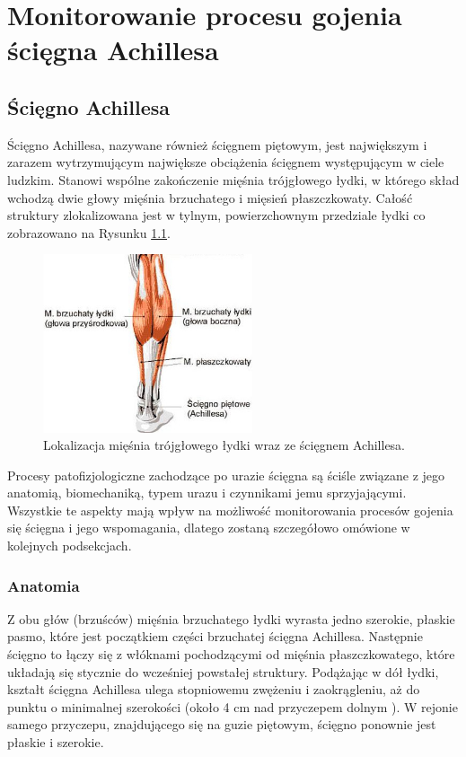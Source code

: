 \chapter{Monitorowanie procesu gojenia ścięgna Achillesa}
\section{Ścięgno Achillesa}
Ścięgno Achillesa, nazywane również ścięgnem piętowym, jest największym i zarazem wytrzymującym największe obciążenia ścięgnem występującym w ciele ludzkim. Stanowi wspólne zakończenie mięśnia trójgłowego łydki, w którego skład wchodzą dwie głowy mięśnia brzuchatego i mięsień płaszczkowaty. Całość struktury zlokalizowana jest w tylnym, powierzchownym przedziale łydki co zobrazowano na Rysunku \ref{muscle_structure}.  
\begin{figure}[h!]
\centering
\includegraphics[width=0.55\textwidth]{figures/muscleStructure.jpg}
\caption{Lokalizacja mięśnia trójgłowego łydki wraz ze ścięgnem Achillesa.}
\label{muscle_structure}
\end{figure}

Procesy patofizjologiczne zachodzące po urazie ścięgna są ściśle związane z jego anatomią, biomechaniką, typem urazu i czynnikami jemu sprzyjającymi. Wszystkie te aspekty mają wpływ na możliwość monitorowania procesów gojenia się ścięgna i jego wspomagania, dlatego zostaną szczegółowo omówione w kolejnych podsekcjach. 

\subsection{Anatomia}
\label{anatomia}

Z obu głów (brzuśców) mięśnia brzuchatego łydki wyrasta jedno szerokie, płaskie pasmo, które jest początkiem części brzuchatej ścięgna Achillesa. Następnie ścięgno to łączy się z włóknami pochodzącymi od mięśnia płaszczkowatego, które układają się stycznie do wcześniej powstałej struktury. Podążając w dół łydki, kształt ścięgna Achillesa ulega stopniowemu zwężeniu i zaokrągleniu, aż do punktu o minimalnej szerokości (około 4 cm nad przyczepem dolnym \cite{Doral2010}). W rejonie samego przyczepu, znajdującego się na guzie piętowym, ścięgno ponownie jest płaskie i szerokie.

